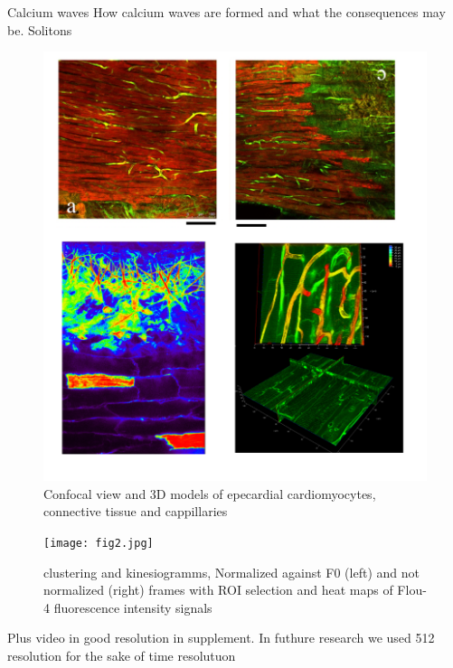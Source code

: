 \documentclass{biophys-new}
\begin{document}
Calcium waves
How calcium waves are formed and what the consequences may be.
Solitons


\begin{figure}[hbt!]
\centering
\includegraphics[width=0.8\linewidth]{fig1.png}
\caption{Confocal view and 3D models of epecardial cardiomyocytes, connective tissue and cappillaries}
\label{fig:fig1}
\end{figure}


\begin{figure}
    \texttt{[image: fig2.jpg]}
    \caption{clustering and kinesiogramms, Normalized against F0 (left) and not normalized (right) frames with ROI selection and heat maps of Flou-4 fluorescence intensity signals }
    \label{fig:fig2}
\end{figure}

Plus video in good resolution in supplement. In futhure research we used 512 resolution for the sake of time resolutuon
\end{document}
